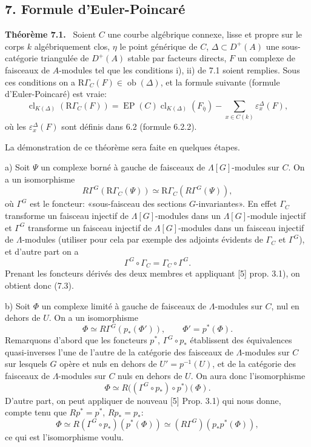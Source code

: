 \documentclass[11pt]{article}
\newenvironment{statement}[1]{\par\medskip\noindent\textbf{#1.}\ }{\par\medskip}
\providecommand{\EP}{\operatorname{EP}}
\providecommand{\Ob}{\operatorname{ob}}
\providecommand{\Ob}{\operatorname{ob}}
\providecommand{\EP}{\operatorname{EP}}
\providecommand{\Ob}{\operatorname{Ob}}
\providecommand{\clK}[1]{\operatorname{cl}_{K(#1)}}
\providecommand{\RG}{\mathrm R\Gamma}
\providecommand{\Ob}{\operatorname{ob}}
\providecommand{\Ob}{\operatorname{Ob}}
\begin{document}
\subsection*{7. Formule d'Euler-Poincaré}

\begin{statement}{Théorème 7.1}
Soient $C$ une courbe algébrique connexe, lisse et propre sur le corps $k$ algébriquement clos, $\eta$ le point générique de $C$, $\Delta\subset D^+(A)$ une sous-catégorie triangulée de $D^+(A)$ stable par facteurs directs, $F$ un complexe de faisceaux de $A$-modules tel que les conditions i), ii) de 7.1 soient remplies. Sous ces conditions on a $\RG_C(F)\in\Ob(\Delta)$, et la formule suivante (formule d'Euler-Poincaré) est vraie:
\[
\clK{\Delta}(\RG_C(F))
=
\EP(C)\clK{\Delta}(F_{\bar\eta})
-\sum_{x\in C(k)}\varepsilon_x^\Delta(F),
\tag{7.2}
\]
où les $\varepsilon_x^\Delta(F)$ sont définis dans 6.2 (formule 6.2.2).
\end{statement}

La démonstration de ce théorème sera faite en quelques étapes.

a) Soit $\Psi$ un complexe borné à gauche de faisceaux de $\Lambda[G]$-modules sur $C$. On a un isomorphisme
\[
R\Gamma^G(\RG_C(\Psi))\simeq\RG_C(R\Gamma^G(\Psi)),
\tag{7.3}
\]
où $\Gamma^G$ est le foncteur: «sous-faisceau des sections $G$-invariantes». En effet $\Gamma_C$ transforme un faisceau injectif de $\Lambda[G]$-modules dans un $\Lambda[G]$-module injectif et $\Gamma^G$ transforme un faisceau injectif de $\Lambda[G]$-modules dans un faisceau injectif de $\Lambda$-modules (utiliser pour cela par exemple des adjoints évidents de $\Gamma_C$ et $\Gamma^G$), et d'autre part on a
\[
\Gamma^G\circ\Gamma_C=\Gamma_C\circ\Gamma^G.
\]
Prenant les foncteurs dérivés des deux membres et appliquant [5] prop. 3.1), on obtient donc (7.3).

b) Soit $\Phi$ un complexe limité à gauche de faisceaux de $\Lambda$-modules sur $C$, nul en dehors de $U$. On a un isomorphisme
\[
\Phi\simeq R\Gamma^G(p_*(\Phi')),
\qquad \Phi'=p^*(\Phi).
\tag{7.4}
\]
Remarquons d'abord que les foncteurs $p^*$, $\Gamma^G\circ p_*$ établissent des équivalences quasi-inverses l'une de l'autre de la catégorie des faisceaux de $\Lambda$-modules sur $C$ sur lesquels $G$ opère et nuls en dehors de $U'=p^{-1}(U)$, et de la catégorie des faisceaux de $\Lambda$-modules sur $C$ nuls en dehors de $U$. On aura donc l'isomorphisme
\[
\Phi\simeq R\bigl((\Gamma^G\circ p_*)\circ p^*\bigr)(\Phi).
\]
D'autre part, on peut appliquer de nouveau [5] Prop. 3.1) qui nous donne, compte tenu que $Rp^*=p^*$, $Rp_*=p_*$:
\[
\Phi\simeq R(\Gamma^G\circ p_*)(p^*(\Phi))
\simeq (R\Gamma^G)(p_*p^*(\Phi)),
\]
ce qui est l'isomorphisme voulu.
\end{document}

